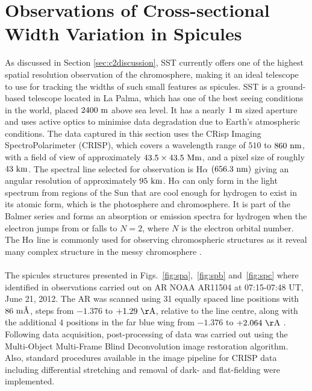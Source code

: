 \documentclass[12pt]{ociamthesis}
\newcommand{\np}{\\ \\}
\newcommand{\angstrom}{\textup{\AA}}
\begin{document}
\section{Observations of Cross-sectional Width Variation in Spicules}
\label{sec:CSW_spicules}
As discussed in Section \ref{sec:c2discussion}, SST currently offers one of the highest spatial resolution observation of the chromosphere, making it an ideal telescope to use for tracking the widths of such small features as spicules. SST is a ground-based telescope located in La Palma, which has one of the best seeing conditions in the world, placed $2400~\rm{m}$ above sea level. It has a nearly $1~\rm{m}$ sized aperture and uses active optics to minimise data degradation due to Earth's atmospheric conditions. The data captured in this section uses the CRisp Imaging SpectroPolarimeter (CRISP), which covers a wavelength range of $510$ to $860~\rm{nm}$, with a field of view of approximately $43.5\times43.5~\rm{Mm}$, and a pixel size of roughly $43~\rm{km}$. The spectral line selected for observation is H$\alpha$ $(656.3~\rm{nm})$ giving an angular resolution of approximately $95~\rm{km}$. H$\alpha$ can only form in the light spectrum from regions of the Sun that are cool enough for hydrogen to exist in its atomic form, which is the photosphere and chromosphere. It is part of the Balmer series and forms an absorption or emission spectra for hydrogen when the electron jumps from or falls to $N=2$, where $N$ is the electron orbital number. The H$\alpha$ line is commonly used for observing chromospheric structures as it reveal many complex structure in the messy chromosphere \citep{Parmenter1966PASP78250P, von1985AA146192V, Nishikawa1988PASJ40613N, Judge2006ASPC354259J, Leenaarts2007AA473625L, Rutten2008ASPC39754R, Jess2012, Pereira2016ApJ82465P, Rutten2017AA598A89R}. \np
%
The spicules structures presented in Figs.~\ref{fig:spa},~\ref{fig:spb} and~\ref{fig:spc} where identified in observations carried out on AR NOAA AR11504 at 07:15-07:48 UT, June 21, 2012. The AR was scanned using 31 equally spaced line positions with $86~\rm{m\angstrom}$, steps from $-1.376$ to $+1.29~\rm{\AA}$, relative to the line centre, along with the additional $4$ positions in the far blue wing from $-1.376$ to $+2.064~\rm{\AA}$ . Following data acquisition, post-processing of data was carried out using the Multi-Object Multi-Frame Blind Deconvolution \citep[MOMFBD;][]{2005} image restoration algorithm. Also, standard procedures available in the image pipeline for CRISP data \citep{2015} including differential stretching and removal of dark- and flat-fielding were implemented. \np
\end{document}
